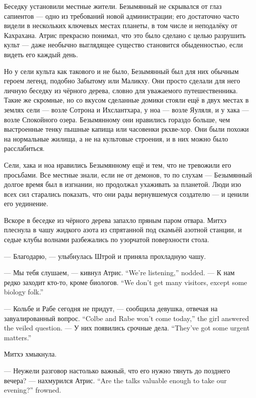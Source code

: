 Беседку установили местные жители.
Безымянный не скрывался от глаз сапиентов --- одно из требований новой администрации;
его достаточно часто видели в нескольких ключевых местах планеты, в том числе и неподалёку от Кахрахана.
Атрис прекрасно понимал, что это было сделано с целью разрушить культ --- даже необычно выглядящее существо становится обыденностью, если видеть его каждый день.

Но у сели культа как такового и не было, Безымянный был для них обычным героем легенд, подобно Забытому или Маликху.
Они просто сделали для него личную беседку из чёрного дерева, словно для уважаемого путешественника.
Такие же скромные, но со вкусом сделанные домики стояли ещё в двух местах в землях сели --- возле Сотрона и Ихслантхара, у ноа --- возле Яуляля, и у хака --- возле Спокойного озера.
Безымянному они нравились гораздо больше, чем выстроенные тенку пышные капища или часовенки ркхве-хор.
Они были похожи на нормальные жилища, а не на культовые строения, и в них можно было расслабиться.

Сели, хака и ноа нравились Безымянному ещё и тем, что не тревожили его просьбами.
Все местные знали, если не от демонов, то по слухам --- Безымянный долгое время был в изгнании, но продолжал ухаживать за планетой.
Люди изо всех сил старались показать, что они рады вернувшемуся создателю --- и ценили его уединение.

Вскоре в беседке из чёрного дерева запахло пряным паром отвара.
Митхэ плеснула в чашу жидкого азота из спрятанной под скамьёй азотной станции, и седые клубы волнами разбежались по узорчатой поверхности стола.

--- Благодарю, --- улыбнулась Штрой и приняла прохладную чашу.

{--- Мы тебя слушаем, --- кивнул Атрис.}
{``We're listening,'' \Aatris{} nodded.}
{--- К нам редко заходит кто-то, кроме биологов.}
{``We don't get many visitors, except some biology folk.''}

{--- Кольбе и Рабе сегодня не придут, --- сообщила девушка, отвечая на завуалированный вопрос.}
{``Colbe and Rabe won't come today,'' the girl answered the veiled question.}
{--- У них появились срочные дела.}
{``They've got some urgent matters.''}

Митхэ хмыкнула.

{--- Неужели разговор настолько важный, что его нужно тянуть до позднего вечера? --- нахмурился Атрис.}
{``Are the talks valuable enough to take our evening?'' \Aatris{} frowned.}

